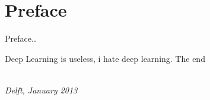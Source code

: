 \chapter*{Preface}

Preface\ldots


Deep Learning is useless, i hate deep learning. 
The end

\begin{flushright}
	{\makeatletter\itshape
		\@author \\
		Delft, January 2013
		\makeatother}
\end{flushright}

